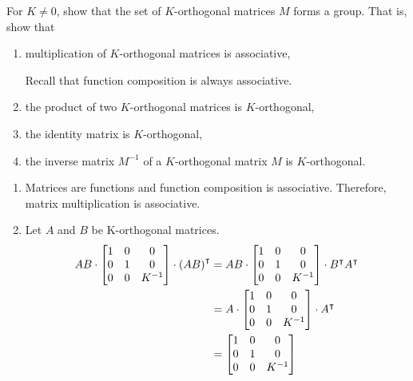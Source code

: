 \documentclass[newpage,hints,handout]{ximera}
\begin{document}
\begin{problem}
For $K\neq0$, show that the set of $K$-orthogonal matrices $M$ forms a
group.  That is, show that
\begin{enumerate}
\item multiplication of $K$-orthogonal matrices is associative, 
	\begin{hint}
	Recall that function composition is always associative.
	\end{hint}
\item the product of two $K$-orthogonal matrices is $K$-orthogonal,
\item the identity matrix is $K$-orthogonal,
\item the inverse matrix $M^{-1}$ of a $K$-orthogonal matrix $M$ is $K$-orthogonal.
\end{enumerate}

\begin{freeResponse}
\begin{enumerate}
\item Matrices are functions and function composition is associative. Therefore, matrix multiplication is associative.

\item Let $A$ and $B$ be K-orthogonal matrices. 
\begin{align*}
AB \cdot \begin{bmatrix}
1 & 0 & 0\\
0 & 1 & 0\\
0 & 0 & K^{-1}%
\end{bmatrix} \cdot
\left(AB\right)^\transpose
&= AB \cdot \begin{bmatrix}
1 & 0 & 0\\
0 & 1 & 0\\
0 & 0 & K^{-1}%
\end{bmatrix} \cdot
B^\transpose A^\transpose \\
&=A \cdot \begin{bmatrix}
1 & 0 & 0\\
0 & 1 & 0\\
0 & 0 & K^{-1}%
\end{bmatrix} \cdot
A^\transpose \\
&= \begin{bmatrix}
1 & 0 & 0\\
0 & 1 & 0\\
0 & 0 & K^{-1}%
\end{bmatrix}
\end{align*}


\end{enumerate}
\end{freeResponse}
\end{problem}
\end{document}
